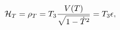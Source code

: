 \begin{equation}\label{taeq}
{\cal H}_T=\rho_{T}
=T_{3}\frac{V(T)}{\sqrt{1-\dot{T}^{2}}}=T_{3}\epsilon,
\end{equation}

